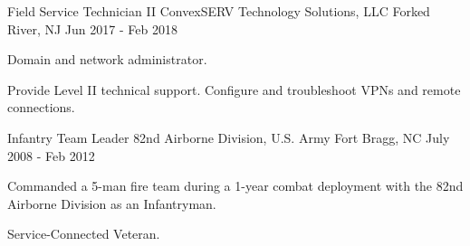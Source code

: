 \begin{cventries}

	\cventry
	{Field Service Technician II}
	{ConvexSERV Technology Solutions, LLC}
	{Forked River, NJ}
	{Jun 2017 - Feb 2018}
	{
		\begin{cvitems}
		\item {Domain and network administrator.}
		\item {Provide Level II technical support. Configure and troubleshoot VPNs and remote connections.}
		\end{cvitems}
	}


	\cventry
	{Infantry Team Leader}
	{82nd Airborne Division, U.S. Army}
	{Fort Bragg, NC}
	{July 2008 - Feb 2012}
	{
		\begin{cvitems}
		\item {Commanded a 5-man fire team during a 1-year combat deployment with the 82nd Airborne Division as an Infantryman.}
		\item {Service-Connected Veteran.}
		\end{cvitems}
	}

\end{cventries}
